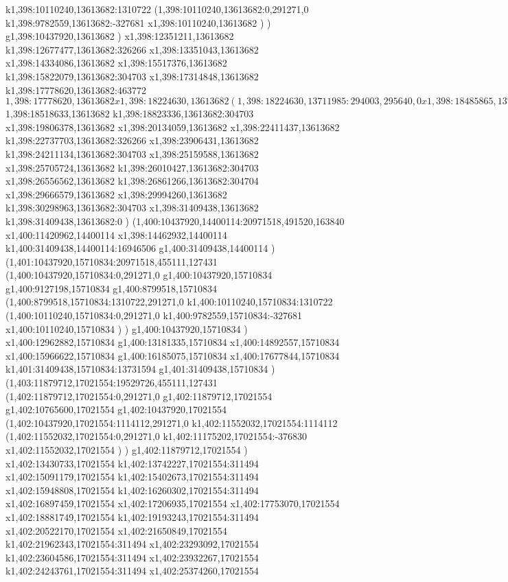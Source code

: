 {k1,398:10110240,13613682:1310722
(1,398:10110240,13613682:0,291271,0
k1,398:9782559,13613682:-327681
x1,398:10110240,13613682
)
)
g1,398:10437920,13613682
)
x1,398:12351211,13613682
k1,398:12677477,13613682:326266
x1,398:13351043,13613682
x1,398:14334086,13613682
x1,398:15517376,13613682
k1,398:15822079,13613682:304703
x1,398:17314848,13613682
k1,398:17778620,13613682:463772
$1,398:17778620,13613682
x1,398:18224630,13613682
(1,398:18224630,13711985:294003,295640,0
x1,398:18485865,13711985
)
$1,398:18518633,13613682
k1,398:18823336,13613682:304703
x1,398:19806378,13613682
x1,398:20134059,13613682
x1,398:22411437,13613682
k1,398:22737703,13613682:326266
x1,398:23906431,13613682
k1,398:24211134,13613682:304703
x1,398:25159588,13613682
x1,398:25705724,13613682
k1,398:26010427,13613682:304703
x1,398:26556562,13613682
k1,398:26861266,13613682:304704
x1,398:29666579,13613682
x1,398:29994260,13613682
k1,398:30298963,13613682:304703
x1,398:31409438,13613682
k1,398:31409438,13613682:0
)
(1,400:10437920,14400114:20971518,491520,163840
x1,400:11420962,14400114
x1,398:14462932,14400114
k1,400:31409438,14400114:16946506
g1,400:31409438,14400114
)
(1,401:10437920,15710834:20971518,455111,127431
(1,400:10437920,15710834:0,291271,0
g1,400:10437920,15710834
g1,400:9127198,15710834
g1,400:8799518,15710834
(1,400:8799518,15710834:1310722,291271,0
k1,400:10110240,15710834:1310722
(1,400:10110240,15710834:0,291271,0
k1,400:9782559,15710834:-327681
x1,400:10110240,15710834
)
)
g1,400:10437920,15710834
)
x1,400:12962882,15710834
g1,400:13181335,15710834
x1,400:14892557,15710834
x1,400:15966622,15710834
g1,400:16185075,15710834
x1,400:17677844,15710834
k1,401:31409438,15710834:13731594
g1,401:31409438,15710834
)
(1,403:11879712,17021554:19529726,455111,127431
(1,402:11879712,17021554:0,291271,0
g1,402:11879712,17021554
g1,402:10765600,17021554
g1,402:10437920,17021554
(1,402:10437920,17021554:1114112,291271,0
k1,402:11552032,17021554:1114112
(1,402:11552032,17021554:0,291271,0
k1,402:11175202,17021554:-376830
x1,402:11552032,17021554
)
)
g1,402:11879712,17021554
)
x1,402:13430733,17021554
k1,402:13742227,17021554:311494
x1,402:15091179,17021554
k1,402:15402673,17021554:311494
x1,402:15948808,17021554
k1,402:16260302,17021554:311494
x1,402:16897459,17021554
x1,402:17206935,17021554
x1,402:17753070,17021554
x1,402:18881749,17021554
k1,402:19193243,17021554:311494
x1,402:20522170,17021554
x1,402:21650849,17021554
k1,402:21962343,17021554:311494
x1,402:23293092,17021554
k1,402:23604586,17021554:311494
x1,402:23932267,17021554
k1,402:24243761,17021554:311494
x1,402:25374260,17021554
}

